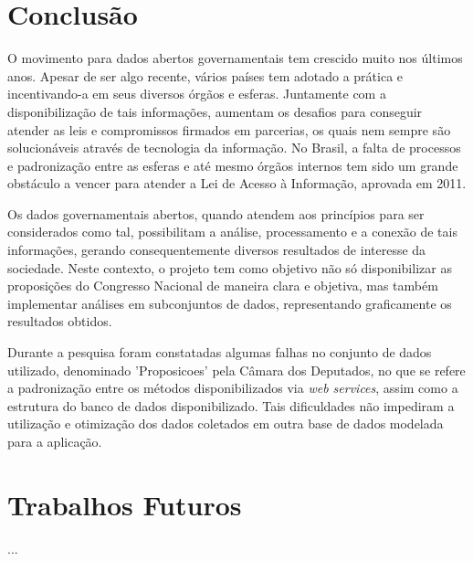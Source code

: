 \documentclass[
	12pt,				%
	openright,			%
	twoside,			%
	a4paper,			%
	english,			%
	french,				%
	spanish,			%
	brazil				%
	]{abntex2}
\begin{document}
{\chapter{Conclusão}

O movimento para dados abertos governamentais tem crescido muito nos últimos anos. Apesar de ser algo recente, vários países
tem adotado a prática e incentivando-a em seus diversos órgãos e esferas. Juntamente com a disponibilização de tais informações,
aumentam os desafios para conseguir atender as leis e compromissos firmados em parcerias, os quais nem sempre são solucionáveis
através de tecnologia da informação. No Brasil, a falta de processos e padronização entre as esferas e até mesmo órgãos internos
tem sido um grande obstáculo a vencer para atender a Lei de Acesso à Informação, aprovada em 2011.

Os dados governamentais abertos, quando atendem aos princípios para ser considerados como tal, possibilitam a análise, 
processamento e a conexão de tais informações, gerando consequentemente diversos resultados de interesse da sociedade. 
Neste contexto, o projeto tem como objetivo não só disponibilizar as proposições do Congresso Nacional de maneira clara e 
objetiva, mas também implementar análises em subconjuntos de dados, representando graficamente os resultados obtidos.

Durante a pesquisa foram constatadas algumas falhas no conjunto de dados utilizado, denominado 'Proposicoes' pela 
Câmara dos Deputados, no que se refere a padronização entre os métodos disponibilizados via \emph{web services}, assim
como a estrutura do banco de dados disponibilizado. Tais dificuldades não impediram a utilização e otimização dos dados
coletados em outra base de dados modelada para a aplicação.


\chapter{Trabalhos Futuros}
...





}
\end{document}
